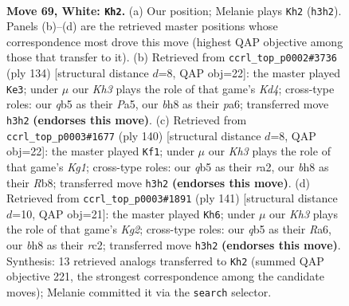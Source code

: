 \documentclass[11pt]{article}
\begin{document}
\clearpage

\begin{figure}[p]\centering
\begin{subfigure}{0.46\textwidth}\centering
\resizebox{\linewidth}{!}{%
\newchessgame
\chessboard[
  setfen={7b/3Pkp2/8/1q6/8/7K/8/8 w - - 1 69},
  showmover=false,
  pgfstyle=straightmove, color=movearrow, markmove={h3-h2}
]}
\caption{}
\end{subfigure}\hfill
\begin{subfigure}{0.46\textwidth}\centering
\resizebox{\linewidth}{!}{%
\newchessgame
\chessboard[
  setfen={8/8/p7/P7/3K1Pkp/8/8/8 w - - 1 68},
  showmover=false,
  pgfstyle=straightmove, color=movearrow, markmove={d4-e3}
]}
\caption{}
\end{subfigure}
\\[4pt]
\begin{subfigure}{0.46\textwidth}\centering
\resizebox{\linewidth}{!}{%
\newchessgame
\chessboard[
  setfen={1R6/8/8/5Pkp/8/8/r7/6K1 w - - 3 71},
  showmover=false,
  pgfstyle=straightmove, color=movearrow, markmove={g1-f1}
]}
\caption{}
\end{subfigure}\hfill
\begin{subfigure}{0.46\textwidth}\centering
\resizebox{\linewidth}{!}{%
\newchessgame
\chessboard[
  setfen={8/6k1/r7/8/7P/6pK/2R5/8 b - - 11 71},
  showmover=false,
  pgfstyle=straightmove, color=movearrow, markmove={g7-h6}
]}
\caption{}
\end{subfigure}
\caption{\textbf{Move 69, White: \texttt{Kh2}.} (a) Our position; Melanie plays \texttt{Kh2} (\texttt{h3h2}). Panels (b)--(d) are the retrieved master positions whose correspondence most drove this move (highest QAP objective among those that transfer to it). (b) Retrieved from \texttt{ccrl\_top\_p0002\#3736} (ply 134) [structural distance $d$=8, QAP obj=22]: the master played \texttt{Ke3}; under $\mu$ our \emph{Kh3} plays the role of that game's \emph{Kd4}; cross-type roles: our \emph{q}b5 as their \emph{P}a5, our \emph{b}h8 as their \emph{p}a6; transferred move \texttt{h3h2} \textbf{(endorses this move)}. (c) Retrieved from \texttt{ccrl\_top\_p0003\#1677} (ply 140) [structural distance $d$=8, QAP obj=22]: the master played \texttt{Kf1}; under $\mu$ our \emph{Kh3} plays the role of that game's \emph{Kg1}; cross-type roles: our \emph{q}b5 as their \emph{r}a2, our \emph{b}h8 as their \emph{R}b8; transferred move \texttt{h3h2} \textbf{(endorses this move)}. (d) Retrieved from \texttt{ccrl\_top\_p0003\#1891} (ply 141) [structural distance $d$=10, QAP obj=21]: the master played \texttt{Kh6}; under $\mu$ our \emph{Kh3} plays the role of that game's \emph{Kg2}; cross-type roles: our \emph{q}b5 as their \emph{R}a6, our \emph{b}h8 as their \emph{r}c2; transferred move \texttt{h3h2} \textbf{(endorses this move)}. Synthesis: 13 retrieved analogs transferred to \texttt{Kh2} (summed QAP objective 221, the strongest correspondence among the candidate moves); Melanie committed it via the \texttt{search} selector.}
\label{fig:thought-m136}
\end{figure}
\end{document}
